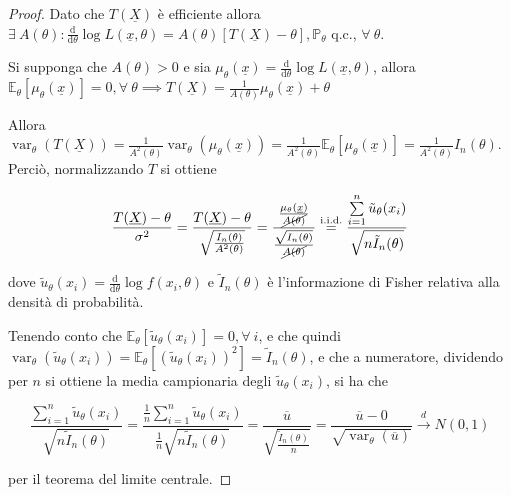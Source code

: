 \documentclass[hidelinks, 10pt]{report}
\DeclareMathOperator{\var}{var}
\begin{document}
\begin{proof}
Dato che $ T(\underline{X}) $ \`e efficiente allora $ \exists\ A(\theta): \frac{\mathrm{d}}{\mathrm{d} \theta} \log L(\underline{x}, \theta) = A(\theta) [T(\underline{X}) - \theta], \mathbb{P}_{\theta} $ q.c., $ \forall\ \theta $.

Si supponga che $ A(\theta) > 0 $ e sia $ \mu_{\theta} (\underline{x}) = \frac{\mathrm{d}}{\mathrm{d} \theta} \log L(\underline{x}, \theta) $, allora $ \mathbb{E}_{\theta} [\mu_{\theta} (\underline{x})] = 0, \forall\ \theta \implies T(\underline{X}) = \frac{1}{A(\theta)} \mu_{\theta}(\underline{x}) + \theta $

Allora $ \var_{\theta} (T(\underline{X})) = \frac{1}{A^2(\theta)} \var_{\theta} (\mu_{\theta}(\underline{x})) = \frac{1}{A^2(\theta)} \mathbb{E}_{\theta} [\mu_{\theta}(\underline{x})] = \frac{1}{A^2(\theta)} I_{n} (\theta) $. Perci\`o, normalizzando $ T $ si ottiene

\[ \frac{T(\underline{X}) - \theta}{\sigma^2} = \frac{T(\underline{X}) - \theta}{\sqrt{\frac{I_n(\theta)}{A^2(\theta)}}} = \frac{\frac{\mu_{\theta}(\underline{x})}{\cancel{A(\theta)}}}{\frac{\sqrt{I_n(\theta)}}{\cancel{A(\theta)}}} \stackrel{\text{i.i.d.}}{=} \frac{\sum\limits_{i = 1}^{n} \tilde{u}_{\theta} (x_i)}{\sqrt{n \tilde{I}_{n} (\theta)}} \]

dove $ \tilde{u}_{\theta} (x_i) = \frac{\mathrm{d}}{\mathrm{d} \theta} \log f(x_i, \theta) $ e $ \tilde{I}_{n} (\theta) $ \`e l'informazione di Fisher relativa alla densit\`a di probabilit\`a.

Tenendo conto che $ \mathbb{E}_{\theta} [\tilde{u}_{\theta} (x_i)] = 0, \forall\ i $, e che quindi $ \var_{\theta} (\tilde{u}_{\theta} (x_i)) = \mathbb{E}_{\theta} [(\tilde{u}_{\theta} (x_i))^2] = \tilde{I}_{n} (\theta) $, e che a numeratore, dividendo per $ n $ si ottiene la media campionaria degli $ \tilde{u}_{\theta} (x_i) $, si ha che 

\[ \frac{\sum\limits_{i = 1}^{n} \tilde{u}_{\theta} (x_i)}{\sqrt{n \tilde{I}_{n} (\theta)}} = \frac{\frac{1}{n} \sum\limits_{i = 1}^{n} \tilde{u}_{\theta} (x_i)}{\frac{1}{n} \sqrt{n \tilde{I}_{n} (\theta)}} = \frac{\overline{u}}{\sqrt{\frac{\tilde{I}_{n} (\theta)}{n}}} = \frac{\overline{u} - 0}{\sqrt{\var_{\theta} (\overline{u})}} \stackrel{d}{\to} N(0, 1) \]

per il teorema del limite centrale.
\end{proof}
\end{document}
